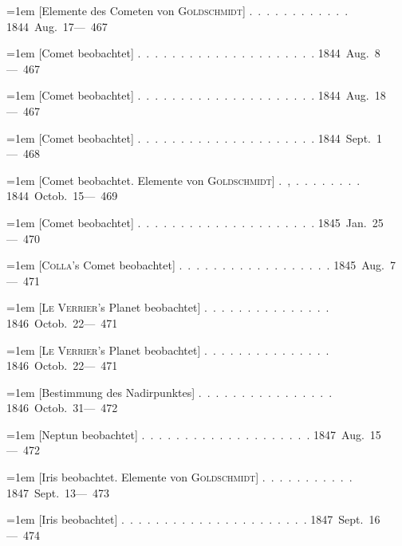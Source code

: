 \noindent\hangindent=1em [Elemente des Cometen von \textsc{Goldschmidt}] \mbox{.\ .\ .\ .\ .\ .\ .\ .\ .\ .\ .\ .} \hfill\mbox{1844 Aug. 17}\quad\mbox{--- 467}\par\smallskip
\noindent\hangindent=1em [Comet beobachtet] \mbox{.\ .\ .\ .\ .\ .\ .\ .\ .\ .\ .\ .\ .\ .\ .\ .\ .\ .\ .\ .\ .} \hfill\mbox{1844 Aug. 8}\quad\mbox{--- 467}\par\smallskip
\noindent\hangindent=1em [Comet beobachtet] \mbox{.\ .\ .\ .\ .\ .\ .\ .\ .\ .\ .\ .\ .\ .\ .\ .\ .\ .\ .\ .\ .} \hfill\mbox{1844 Aug. 18}\quad\mbox{--- 467}\par\smallskip
\noindent\hangindent=1em [Comet beobachtet] \mbox{.\ .\ .\ .\ .\ .\ .\ .\ .\ .\ .\ .\ .\ .\ .\ .\ .\ .\ .\ .\ .} \hfill\mbox{1844 Sept. 1}\quad\mbox{--- 468}\par\smallskip
\noindent\hangindent=1em [Comet beobachtet. Elemente von \textsc{Goldschmidt}] \mbox{.\ ,\ .\ .\ .\ .\ .\ .\ .\ .} \hfill\mbox{1844 Octob. 15}\quad\mbox{--- 469}\par\smallskip
\noindent\hangindent=1em [Comet beobachtet] \mbox{.\ .\ .\ .\ .\ .\ .\ .\ .\ .\ .\ .\ .\ .\ .\ .\ .\ .\ .\ .\ .} \hfill\mbox{1845 Jan. 25}\quad\mbox{--- 470}\par\smallskip
\noindent\hangindent=1em [\textsc{Colla}'s Comet beobachtet] \mbox{.\ .\ .\ .\ .\ .\ .\ .\ .\ .\ .\ .\ .\ .\ .\ .\ .\ .} \hfill\mbox{1845 Aug. 7}\quad\mbox{--- 471}\par\smallskip
\noindent\hangindent=1em [\textsc{Le Verrier}'s Planet beobachtet] \mbox{.\ .\ .\ .\ .\ .\ .\ .\ .\ .\ .\ .\ .\ .\ .} \hfill\mbox{1846 Octob. 22}\quad\mbox{--- 471}\par\smallskip
\noindent\hangindent=1em [\textsc{Le Verrier}'s Planet beobachtet] \mbox{.\ .\ .\ .\ .\ .\ .\ .\ .\ .\ .\ .\ .\ .\ .} \hfill\mbox{1846 Octob. 22}\quad\mbox{--- 471}\par\smallskip
\noindent\hangindent=1em [Bestimmung des Nadirpunktes] \mbox{.\ .\ .\ .\ .\ .\ .\ .\ .\ .\ .\ .\ .\ .\ .\ .} \hfill\mbox{1846 Octob. 31}\quad\mbox{--- 472}\par\smallskip
\noindent\hangindent=1em [Neptun beobachtet] \mbox{.\ .\ .\ .\ .\ .\ .\ .\ .\ .\ .\ .\ .\ .\ .\ .\ .\ .\ .\ .} \hfill\mbox{1847 Aug. 15}\quad\mbox{--- 472}\par\smallskip
\noindent\hangindent=1em [Iris beobachtet. Elemente von \textsc{Goldschmidt}] \mbox{.\ .\ .\ .\ .\ .\ .\ .\ .\ .\ .} \hfill\mbox{1847 Sept. 13}\quad\mbox{--- 473}\par\smallskip
\noindent\hangindent=1em [Iris beobachtet] \mbox{.\ .\ .\ .\ .\ .\ .\ .\ .\ .\ .\ .\ .\ .\ .\ .\ .\ .\ .\ .\ .\ .} \hfill\mbox{1847 Sept. 16}\quad\mbox{--- 474}\par\smallskip

